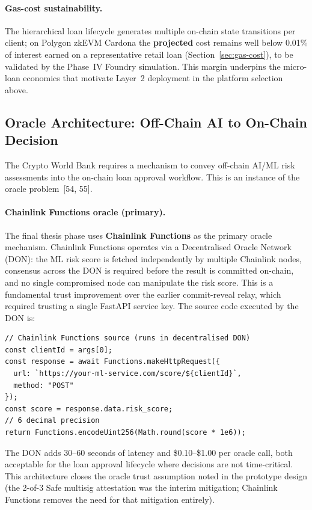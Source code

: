 \documentclass[12pt, a4paper]{report}
\begin{document}
\paragraph{Gas-cost sustainability.}
The hierarchical loan lifecycle generates multiple on-chain state transitions per client; on Polygon zkEVM Cardona the \textbf{projected} cost remains well below 0.01\% of interest earned on a representative retail loan (Section~\ref{sec:gas-cost}), to be validated by the Phase~IV Foundry simulation. This margin underpins the micro-loan economics that motivate Layer~2 deployment in the platform selection above.

\subsection{Oracle Architecture: Off-Chain AI to On-Chain Decision}
\label{sec:oracle-architecture}

The Crypto World Bank requires a mechanism to convey off-chain AI/ML risk assessments into the on-chain loan approval workflow. This is an instance of the oracle problem~[54, 55].

\paragraph{Chainlink Functions oracle (primary).}
The final thesis phase uses \textbf{Chainlink Functions} as the primary oracle mechanism. Chainlink Functions operates via a Decentralised Oracle Network (DON): the ML risk score is fetched independently by multiple Chainlink nodes, consensus across the DON is required before the result is committed on-chain, and no single compromised node can manipulate the risk score. This is a fundamental trust improvement over the earlier commit-reveal relay, which required trusting a single FastAPI service key. The source code executed by the DON is:

\begin{verbatim}
// Chainlink Functions source (runs in decentralised DON)
const clientId = args[0];
const response = await Functions.makeHttpRequest({
  url: `https://your-ml-service.com/score/${clientId}`,
  method: "POST"
});
const score = response.data.risk_score;
// 6 decimal precision
return Functions.encodeUint256(Math.round(score * 1e6));
\end{verbatim}

The DON adds 30--60 seconds of latency and \$0.10--\$1.00 per oracle call, both acceptable for the loan approval lifecycle where decisions are not time-critical. This architecture closes the oracle trust assumption noted in the prototype design (the 2-of-3 Safe multisig attestation was the interim mitigation; Chainlink Functions removes the need for that mitigation entirely).
\end{document}
